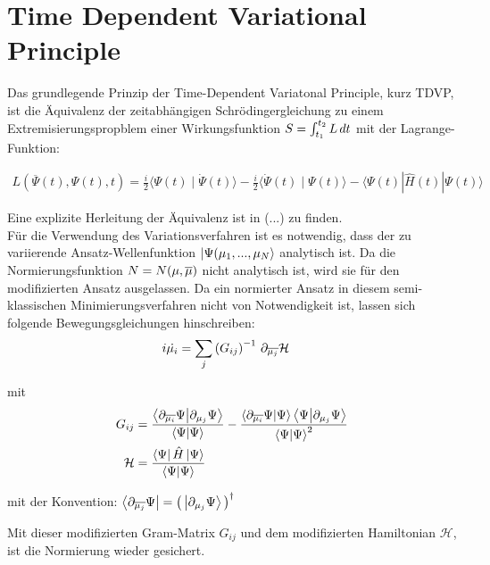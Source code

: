 \chapter{Time Dependent Variational Principle}\label{make}

Das grundlegende Prinzip der Time-Dependent Variatonal Principle, kurz TDVP, ist die Äquivalenz der zeitabhängigen Schrödingergleichung
 zu einem Extremisierungspropblem einer Wirkungsfunktion $S=\int_{t_1}^{t_2}L \thinspace dt$ mit der Lagrange-Funktion:

\begin{align}
    L\left(\overline{\Psi}(t), \Psi(t), t\right)=\frac{i}{2}\langle\Psi(t) \mid \dot{\Psi}(t)\rangle-\frac{i}{2}\langle\dot{\Psi}(t) \mid \Psi(t)\rangle-\langle\Psi(t)|\hat{H}(t)| \Psi(t)\rangle
\end{align}

Eine explizite Herleitung der Äquivalenz ist in (...) zu finden. \\

\noindent Für die Verwendung des Variationsverfahren ist es notwendig, dass der zu variierende Ansatz-Wellenfunktion 
$\ket{\Psi(\mu_1,...,\mu_N}$ analytisch ist. Da die Normierungsfunktion $N=N(\mu,\overline{\mu})$ nicht analytisch ist, wird sie 
für den modifizierten Ansatz ausgelassen. Da ein normierter Ansatz in diesem semi-klassischen Minimierungsverfahren nicht 
von Notwendigkeit ist, lassen sich folgende Bewegungsgleichungen hinschreiben:
\begin{align}
    i\dot{\mu_i} &= \sum_{j}\left(G_{ij}\right)^{-1}\thinspace \partial_{\overline{\mu_j}}\mathcal{H}
\end{align}

mit 
\begin{align}
    G_{ij} &= \frac{\bra{\partial_{\overline{\mu_i}}\Psi}\ket{\partial_{\mu_j}\Psi}}{\bra{\Psi}\ket{\Psi}} 
    - \frac{\bra{\partial_{\overline{\mu_i}}\Psi}\ket{\Psi}\bra{\Psi}\ket{\partial_{\mu_j}\Psi}}{\bra{\Psi}\ket{\Psi}^2} \\
    \mathcal{H} &= \frac{\bra{\Psi}\hat{H}\ket{\Psi}}{\bra{\Psi}\ket{\Psi}}
\end{align}

\noindent mit der Konvention: $\bra{\partial_{\overline{\mu_j}}\Psi} = \left(\thinspace\ket{\partial_{\mu_j}\Psi}\thinspace\right)^\dagger$

\noindent Mit dieser modifizierten Gram-Matrix $G_{ij}$ und dem modifizierten Hamiltonian $\mathcal{H}$, ist die Normierung wieder 
gesichert. 

\newpage











